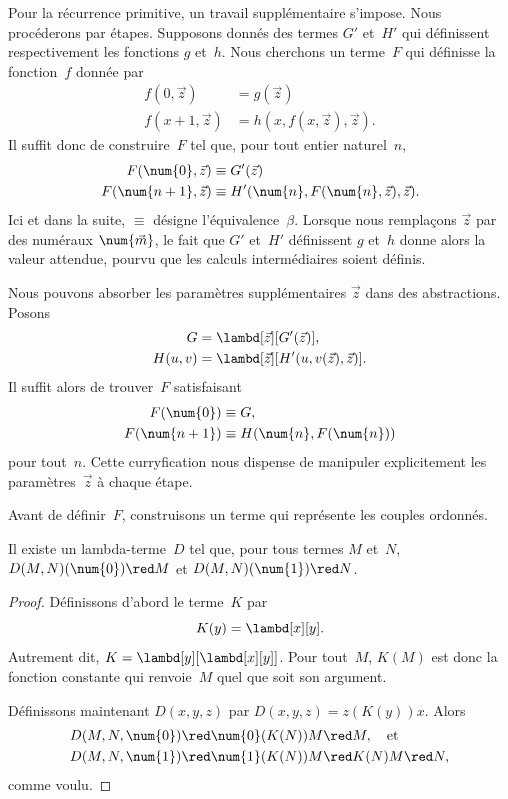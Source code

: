 \documentclass[../../../include/open-logic-section]{subfiles}
\begin{document}

Pour la récurrence primitive, un travail supplémentaire
s'impose. Nous procéderons par étapes. Supposons donnés
des termes $G'$ et~$H'$ qui définissent respectivement
les fonctions $g$ et~$h$. Nous cherchons un terme~$F$
qui définisse la fonction~$f$ donnée par
\begin{align*}
f(0, \vec z) & = g(\vec z) \\
f(x+1, \vec z) & = h(x, f(x,\vec z), \vec z).
\end{align*}
Il suffit donc de construire~$F$ tel que, pour tout
entier naturel~$n$,
\begin{align*}
F(\num{0}, \vec z) & \equiv G'(\vec z) \\
F(\num{n+1}, \vec z) & \equiv
  H'(\num{n}, F(\num{n}, \vec z), \vec z).
\end{align*}
Ici et dans la suite, $\equiv$ désigne
l'équivalence~$\beta$. Lorsque nous remplaçons
$\vec z$ par des numéraux $\num{\vec m}$, le fait
que $G'$ et~$H'$ définissent $g$ et~$h$ donne alors
la valeur attendue, pourvu que les calculs
intermédiaires soient définis.

Nous pouvons absorber les paramètres supplémentaires
$\vec z$ dans des abstractions. Posons
\begin{align*}
G & = \lambd[\vec z][G'(\vec z)], \\
H(u,v) & = \lambd[\vec z][H'(u,v(\vec z),\vec z)].
\end{align*}
Il suffit alors de trouver~$F$ satisfaisant
\begin{align*}
F(\num{0}) & \equiv G, \\
F(\num{n+1}) & \equiv H(\num{n},F(\num{n}))
\end{align*}
pour tout~$n$. Cette curryfication nous dispense
de manipuler explicitement les paramètres~$\vec z$
à chaque étape.

Avant de définir~$F$, construisons un terme qui
représente les couples ordonnés.

\begin{lem}
Il existe un lambda-terme~$D$ tel que, pour tous
termes $M$ et~$N$,
$D(M,N)(\num{0})\red M$ et
$D(M,N)(\num{1})\red N$.
\end{lem}

\begin{proof}
Définissons d'abord le terme~$K$ par
\[
K(y)=\lambd[x][y].
\]
Autrement dit, $K=\lambd[y][\lambd[x][y]]$.
Pour tout~$M$, $K(M)$ est donc la fonction
constante qui renvoie~$M$ quel que soit son
argument.

Définissons maintenant $D(x,y,z)$ par
$D(x,y,z)=z(K(y))x$. Alors
\begin{align*}
D(M,N,\num{0}) & \red \num{0}(K(N))M \red M,
  \quad\text{et}\\
D(M,N,\num{1}) & \red \num{1}(K(N))M
  \red K(N)M \red N,
\end{align*}
comme voulu.
\end{proof}
\end{document}
